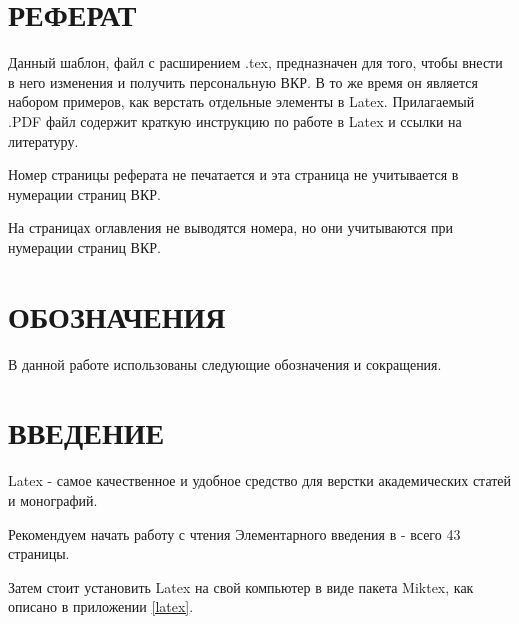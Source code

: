 \documentclass[a4paper,14pt,oneside]{book}
\theoremstyle{plain} %
\theoremstyle{definition} %
\theoremstyle{remark} %
\begin{document}
\pagestyle{plain}
\chapter*{РЕФЕРАТ}

\thispagestyle{empty}   %
Данный шаблон, файл с расширением .tex, предназначен для того, чтобы внести в него изменения и получить персональную ВКР. В то же время он является набором примеров, как верстать отдельные элементы в Latex. Прилагаемый .PDF файл содержит краткую инструкцию по работе в Latex и ссылки на литературу.

Номер страницы реферата не печатается и эта страница не учитывается в нумерации страниц ВКР.

На страницах оглавления не выводятся номера, но они учитываются при нумерации страниц ВКР.

\cleardoublepage                       %

\renewcommand\contentsname{Содержание}
\tableofcontents

\cleardoublepage                    %

\setcounter{page}{4}  %

\chapter*{ОБОЗНАЧЕНИЯ}

В данной работе использованы следующие обозначения и сокращения.

\chapter*{ВВЕДЕНИЕ}

 Latex - самое качественное и удобное средство для верстки академических статей и монографий.

Рекомендуем начать работу с чтения Элементарного введения в \cite{__2003} - всего 43 страницы.

Затем стоит установить Latex на свой компьютер  в виде пакета Miktex, как описано в приложении \ref{latex}. 
\end{document}
